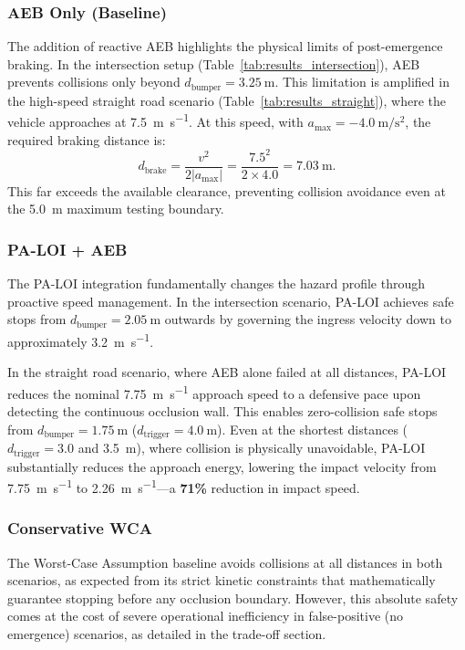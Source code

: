 \documentclass[conference]{IEEEtran}
\begin{document}
\subsubsection{AEB Only (Baseline)}
The addition of reactive AEB highlights the physical limits of post-emergence braking. In the intersection setup (Table~\ref{tab:results_intersection}), AEB prevents collisions only beyond $d_{\text{bumper}} = \SI{3.25}{\meter}$. This limitation is amplified in the high-speed straight road scenario (Table~\ref{tab:results_straight}), where the vehicle approaches at \SI{7.5}{\meter\per\second}. At this speed, with $a_{\text{max}} = \SI{-4.0}{\meter\per\second\squared}$, the required braking distance is:
\begin{equation}
    d_{\text{brake}} = \frac{v^2}{2|a_{\text{max}}|} = \frac{7.5^2}{2 \times 4.0} = \SI{7.03}{\meter}.
\end{equation}
This far exceeds the available clearance, preventing collision avoidance even at the \SI{5.0}{\meter} maximum testing boundary.

\subsubsection{PA-LOI + AEB}
The PA-LOI integration fundamentally changes the hazard profile through proactive speed management. In the intersection scenario, PA-LOI achieves safe stops from $d_{\text{bumper}} = \SI{2.05}{\meter}$ outwards by governing the ingress velocity down to approximately \SI{3.2}{\meter\per\second}. 

In the straight road scenario, where AEB alone failed at all distances, PA-LOI reduces the nominal \SI{7.75}{\meter\per\second} approach speed to a defensive pace upon detecting the continuous occlusion wall. This enables zero-collision safe stops from $d_{\text{bumper}} = \SI{1.75}{\meter}$ ($d_{\text{trigger}} = \SI{4.0}{\meter}$). Even at the shortest distances ($d_{\text{trigger}} = 3.0$ and \SI{3.5}{\meter}), where collision is physically unavoidable, PA-LOI substantially reduces the approach energy, lowering the impact velocity from \SI{7.75}{\meter\per\second} to \SI{2.26}{\meter\per\second}---a \textbf{71\%} reduction in impact speed.

\subsubsection{Conservative WCA}
The Worst-Case Assumption baseline avoids collisions at all distances in both scenarios, as expected from its strict kinetic constraints that mathematically guarantee stopping before any occlusion boundary. However, this absolute safety comes at the cost of severe operational inefficiency in false-positive (no emergence) scenarios, as detailed in the trade-off section.
\end{document}
